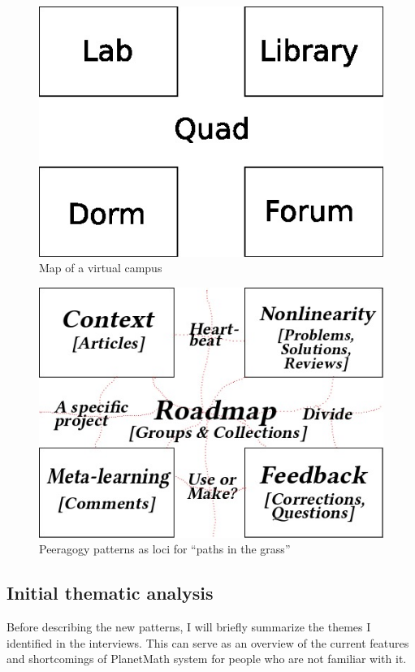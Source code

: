 \begin{figure}
\begin{center}
\includegraphics[width=.7\textwidth]{../pictures/PeeragogyEDU.jpg}
\end{center}
\caption*{Map of a virtual campus}
\end{figure}

\begin{figure}
\begin{center}
\includegraphics[width=.7\textwidth]{../pictures/PeeragogyEDU-paths.jpg}
\end{center}
\caption*{Peeragogy patterns as loci for ``paths in the grass''}
\end{figure}

\subsection{Initial thematic analysis}

Before describing the new patterns, I will briefly summarize the themes
I identified in the interviews. This can serve as an overview of the
current features and shortcomings of PlanetMath system for people who
are not familiar with it.

